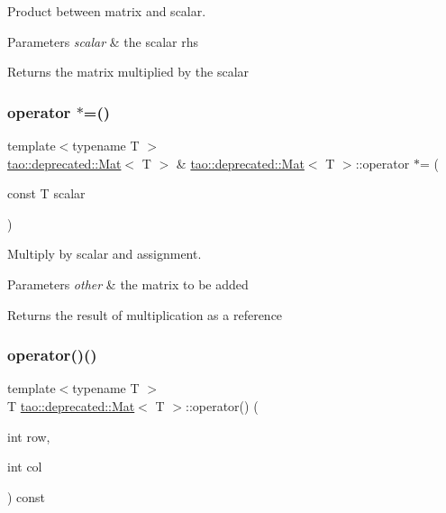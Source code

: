 Product between matrix and scalar. 


\begin{DoxyParams}{Parameters}
{\em scalar} & the scalar rhs \\
\hline
\end{DoxyParams}
\begin{DoxyReturn}{Returns}
the matrix multiplied by the scalar 
\end{DoxyReturn}
\mbox{\label{classtao_1_1deprecated_1_1_mat_a83be68d91111675cc9ba60dd85cb173a}} 
\subsubsection{\texorpdfstring{operator $\ast$=()}{operator *=()}}
{\footnotesize\ttfamily template$<$typename T $>$ \\
\mbox{\hyperlink{classtao_1_1deprecated_1_1_mat}{tao\+::deprecated\+::\+Mat}}$<$ T $>$ \& \mbox{\hyperlink{classtao_1_1deprecated_1_1_mat}{tao\+::deprecated\+::\+Mat}}$<$ T $>$\+::operator $\ast$= (\begin{DoxyParamCaption}\item[{const T}]{scalar }\end{DoxyParamCaption})}



Multiply by scalar and assignment. 


\begin{DoxyParams}{Parameters}
{\em other} & the matrix to be added \\
\hline
\end{DoxyParams}
\begin{DoxyReturn}{Returns}
the result of multiplication as a reference 
\end{DoxyReturn}
\mbox{\label{classtao_1_1deprecated_1_1_mat_ae6836422348c15929bbe0ee727077db4}} 
\subsubsection{\texorpdfstring{operator()()}{operator()()}\hspace{0.1cm}{\footnotesize\ttfamily [1/2]}}
{\footnotesize\ttfamily template$<$typename T $>$ \\
T \mbox{\hyperlink{classtao_1_1deprecated_1_1_mat}{tao\+::deprecated\+::\+Mat}}$<$ T $>$\+::operator() (\begin{DoxyParamCaption}\item[{int}]{row,  }\item[{int}]{col }\end{DoxyParamCaption}) const}



